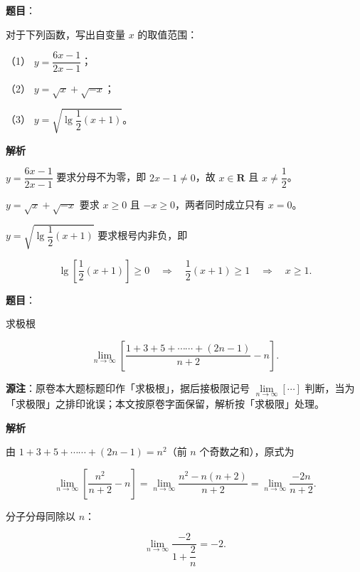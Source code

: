 \begin{answer}

\textbf{题目}：

对于下列函数，写出自变量 $x$ 的取值范围：

（1） $y=\dfrac{6x-1}{2x-1}$；

（2） $y=\sqrt{x}+\sqrt{-x}$；

（3） $y=\sqrt{\lg\dfrac12(x+1)}$。

\textbf{解析}


$y=\dfrac{6x-1}{2x-1}$ 要求分母不为零，即 $2x-1\ne0$，故 $x\in\mathbf R$ 且 $x\ne\dfrac12$。


$y=\sqrt{x}+\sqrt{-x}$ 要求 $x\ge0$ 且 $-x\ge0$，两者同时成立只有 $x=0$。


$y=\sqrt{\lg\dfrac12(x+1)}$ 要求根号内非负，即

\nopagebreak[4]
\[
\lg\left[\frac12(x+1)\right]\ge0
\quad\Longrightarrow\quad
\frac12(x+1)\ge1
\quad\Longrightarrow\quad
x\ge1.
\]




\end{answer}
\begin{answer}

\textbf{题目}：

求极根

\nopagebreak[4]
\[
\lim_{n\to\infty}\left[\frac{1+3+5+\cdots\cdots+(2n-1)}{n+2}-n\right].
\]

\begin{gktip}
\textbf{源注}：原卷本大题标题印作「求极根」，据后接极限记号 $\lim\limits_{n\to\infty}[\cdots]$ 判断，当为「求极限」之排印讹误；本文按原卷字面保留，解析按「求极限」处理。
\end{gktip}

\textbf{解析}

由 $1+3+5+\cdots\cdots+(2n-1)=n^2$（前 $n$ 个奇数之和），原式为

\nopagebreak[4]
\[
\lim_{n\to\infty}\left[\frac{n^2}{n+2}-n\right]
=\lim_{n\to\infty}\frac{n^2-n(n+2)}{n+2}
=\lim_{n\to\infty}\frac{-2n}{n+2}.
\]

分子分母同除以 $n$：

\nopagebreak[4]
\[
\lim_{n\to\infty}\frac{-2}{1+\dfrac2n}=-2.
\]


\end{answer}
